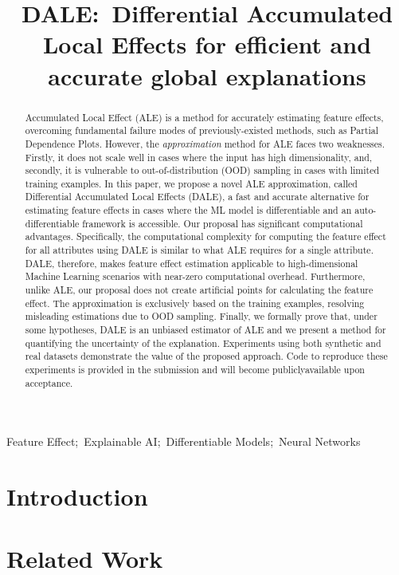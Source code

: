 \documentclass[wcp]{jmlr}
\title[DALE:~Differential Accumulated Local
Effects]{DALE:~Differential Accumulated Local Effects for efficient
and accurate global explanations}
\begin{document}
\maketitle

\begin{abstract}
  Accumulated Local Effect (ALE) is a method for accurately estimating
  feature effects, overcoming fundamental failure modes of
  previously-existed methods, such as Partial Dependence
  Plots. However, the \textit{approximation} method for ALE faces two
  weaknesses. Firstly, it does not scale well in cases where the input
  has high dimensionality, and, secondly, it is vulnerable to
  out-of-distribution (OOD) sampling in cases with limited training
  examples. In this paper, we propose a novel ALE approximation,
  called Differential Accumulated Local Effects (DALE), a fast and
  accurate alternative for estimating feature effects in cases where
  the ML model is differentiable and an auto-differentiable framework
  is accessible. Our proposal has significant computational
  advantages. Specifically, the computational complexity for computing
  the feature effect for all attributes using DALE is similar to what
  ALE requires for a single attribute. DALE, therefore, makes feature
  effect estimation applicable to high-dimensional Machine Learning
  scenarios with near-zero computational overhead. Furthermore, unlike
  ALE, our proposal does not create artificial points for calculating
  the feature effect. The approximation is exclusively based on the
  training examples, resolving misleading estimations due to OOD
  sampling. Finally, we formally prove that, under some hypotheses,
  DALE is an unbiased estimator of ALE and we present a method for
  quantifying the uncertainty of the explanation. Experiments using
  both synthetic and real datasets demonstrate the value of the
  proposed approach. Code to reproduce these experiments is provided
  in the submission and will become publiclyavailable upon acceptance.
\end{abstract}
\begin{keywords}
Feature Effect;~Explainable AI;~Differentiable Models;~Neural Networks
\end{keywords}

\section{Introduction}

\label{sec:1-introduction}

\section{Related Work}

\label{sec:2-related}
\end{document}
